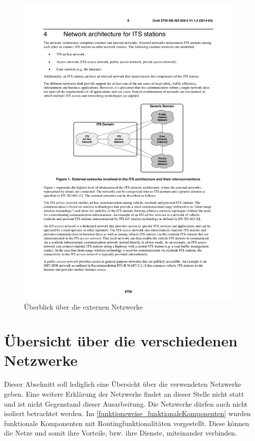 \begin{figure}[h]
	\includegraphics[width=0.99\textwidth]{content/images/02_architektur/uebersichtExterneNetzwerke.pdf}
	\caption{Überblick über die externen Netzwerke \cite{etsi302636-3}}
	\label{fig:architektur_ueberblickNetzwerke}
\end{figure}

\section{Übersicht über die verschiedenen Netzwerke \label{architektur_ueberblickNetzwerke}}
Dieser Abschnitt soll lediglich eine Übersicht über die verwendeten Netzwerke geben. Eine weitere Erklärung der Netzwerke findet an dieser Stelle nicht statt und ist nicht Gegenstand dieser Ausarbeitung. Die Netzwerke dürfen auch nicht isoliert betrachtet werden. Im  \autoref{funktionsweise_funktionaleKomponenten} wurden funktionale Komponenten mit Routingfunktionalitäten vorgestellt. Diese können die Netze und somit ihre Vorteile, bzw. ihre Dienste, miteinander verbinden.

